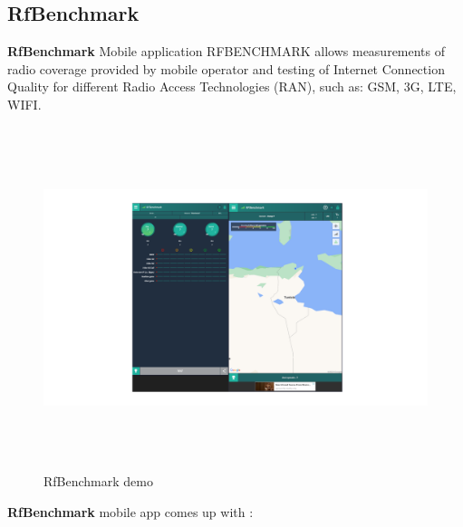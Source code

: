 \subsection{RfBenchmark}
\textbf{RfBenchmark}  Mobile application RFBENCHMARK allows measurements of radio coverage provided by mobile operator and testing of Internet Connection Quality for different Radio Access Technologies (RAN), such as: GSM, 3G, LTE, WIFI.\cite{RFBenchmark}
\begin{figure}[H]
    \centering
    \includegraphics[height=10cm]{images/chap1/RFBenchmark.png}
    \caption{RfBenchmark demo}
    \label{fig:enter-label}
\end{figure}
\textbf{RfBenchmark} mobile app comes up with :
